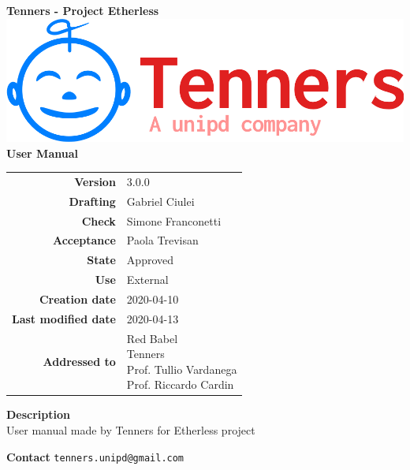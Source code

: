 \begin{titlepage}
	\begin{center}
		\large \textbf{Tenners - Project Etherless}
		\vfill
		\includegraphics[scale = 0.3]{./res/img/logo.png}\\
		\vfill
		\Huge \textbf{User Manual}

        \vfill
        \large

        \begin{tabular}{r|l}
                        \textbf{Version} & 3.0.0 \\
                        \textbf{Drafting} &
                        Gabriel Ciulei\\
                        \textbf{Check} &
                        Simone Franconetti\\
                        \textbf{Acceptance} &
                        Paola Trevisan\\
                        \textbf{State} & Approved \\
                        \textbf{Use} & External\\
                        \textbf{Creation date} &  2020-04-10\\
                        \textbf{Last modified date} &  2020-04-13\\
                        \textbf{Addressed to} & \parbox[t]{5cm}{Red Babel \\Tenners \\Prof. Tullio Vardanega \\Prof. Riccardo Cardin
                        							}
                \end{tabular}
                \vfill
                \normalsize
                \vfill
                                \textbf{Description}
                \\User manual made by Tenners for Etherless project
                \vfill
                \normalsize
                \vfill
                
                \textbf{Contact}
                \texttt{tenners.unipd@gmail.com}

	\end{center}
\end{titlepage}
